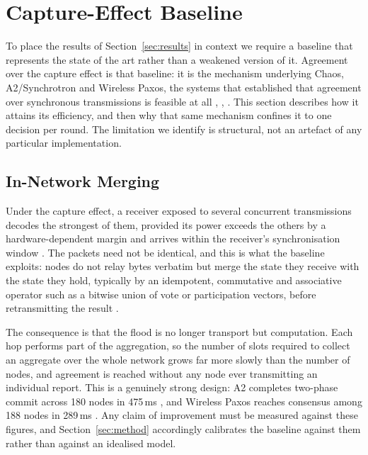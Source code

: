 \documentclass[journal]{IEEEtran}
\begin{document}
\section{Capture-Effect Baseline}
\label{sec:baseline}
To place the results of Section~\ref{sec:results} in context we require a
baseline that represents the state of the art rather than a weakened
version of it. Agreement over the capture effect is that baseline: it is
the mechanism underlying Chaos, A2/Synchrotron and Wireless Paxos, the
systems that established that agreement over synchronous transmissions is
feasible at all \cite{landsiedel13chaos}, \cite{alnahas17a2},
\cite{poirot19paxos}. This section describes how it attains its
efficiency, and then why that same mechanism confines it to one decision
per round. The limitation we identify is structural, not an artefact of
any particular implementation.

\subsection{In-Network Merging}
\label{sec:baseline-merge}

Under the capture effect, a receiver exposed to several concurrent
transmissions decodes the strongest of them, provided its power exceeds
the others by a hardware-dependent margin and arrives within the
receiver's synchronisation window \cite{wilhelm14reception}. The packets
need not be identical, and this is what the baseline exploits: nodes do
not relay bytes verbatim but merge the state they receive with the state
they hold, typically by an idempotent, commutative and associative
operator such as a bitwise union of vote or participation vectors, before
retransmitting the result \cite{landsiedel13chaos}.

The consequence is that the flood is no longer transport but computation.
Each hop performs part of the aggregation, so the number of slots required
to collect an aggregate over the whole network grows far more slowly than
the number of nodes, and agreement is reached without any node ever
transmitting an individual report. This is a genuinely strong design:
A2 completes two-phase commit across 180 nodes in 475\,ms
\cite{alnahas17a2}, and Wireless Paxos reaches consensus among 188 nodes
in 289\,ms \cite{poirot19paxos}. Any claim of improvement must be measured
against these figures, and Section~\ref{sec:method} accordingly calibrates
the baseline against them rather than against an idealised model.
\end{document}
